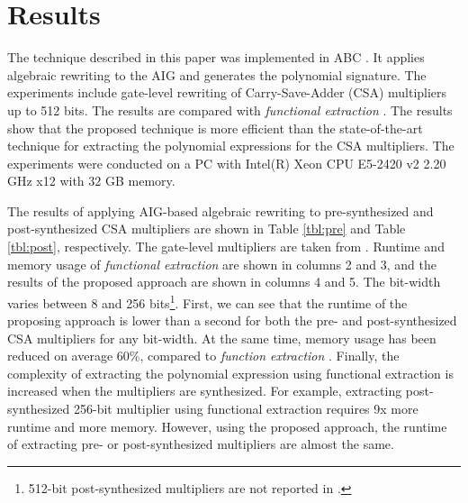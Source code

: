 \section{Results}

The technique described in this paper was implemented in ABC \cite{abc-link}. It applies algebraic rewriting to the AIG and generates the polynomial signature. The experiments include gate-level rewriting of Carry-Save-Adder (CSA) multipliers up to 512 bits. The results are compared with \textit{functional extraction} \cite{ciesielski2015verification}.
The results show that the proposed technique is more efficient than the state-of-the-art technique for extracting the polynomial expressions for the CSA multipliers. The experiments were conducted on a PC with Intel(R) Xeon CPU E5-2420 v2 2.20 GHz x12 with 32 GB memory.

The results of applying AIG-based algebraic rewriting to pre-synthesized and post-synthesized CSA multipliers are shown in Table \ref{tbl:pre} and Table \ref{tbl:post}, respectively. The gate-level multipliers are taken from \cite{ciesielski2015verification}. Runtime and memory usage of \textit{functional extraction} \cite{ciesielski2015verification} are shown in columns 2 and 3, and the results of the proposed approach are shown in columns 4 and 5. The bit-width varies between 8 and 256 bits\footnote{512-bit post-synthesized multipliers are not reported in \cite{ciesielski2015verification}.}. First, we can see that the runtime of the proposing approach is lower than a second for both the pre- and post-synthesized CSA multipliers for any bit-width. At the same time, memory usage has been reduced on average 60\%, compared to \textit{function extraction} \cite{ciesielski2015verification}. Finally, the complexity of extracting the polynomial expression using functional extraction is increased when the multipliers are synthesized. For example, extracting post-synthesized 256-bit multiplier using functional extraction requires 9x more runtime and more memory. However, using the proposed approach, the runtime of extracting pre- or post-synthesized multipliers are almost the same.




%
